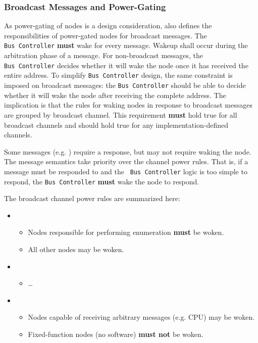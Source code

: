 \subsubsection{Broadcast Messages and Power-Gating}
As power-gating of nodes is a \bus design consideration, \bus also defines the
responsibilities of power-gated nodes for broadcast messages. The {\tt
Bus~Controller} {\bf must} wake for every message. Wakeup shall occur during
the arbitration phase of a message. For non-broadcast messages, the {\tt
Bus~Controller} decides whether it will wake the node once it has received the
entire address. To simplify {\tt Bus~Controller} design, the same constraint
is imposed on broadcast messages: the {\tt Bus~Controller} should be able to
decide whether it will wake the node after receiving the complete address.
The implication is that the rules for waking nodes in response to broadcast
messages are grouped by broadcast channel. This requirement {\bf must} hold
true for all \bus broadcast channels and should hold true for any
implementation-defined channels.

Some messages (e.g. ) require a response, but may
not require waking the node. The message semantics take priority over the
channel power rules. That is, if a message must be responded to and the {\tt
Bus~Controller} logic is too simple to respond, the {\tt Bus~Controller} {\bf
must} wake the node to respond.

The \bus broadcast channel power rules are summarized here:
\begin{itemize}
  \item {}
  \begin{itemize}
    \item Nodes responsible for performing enumeration {\bf must} be woken.
    \item All other nodes may be woken.
  \end{itemize}
  \item {}
  \begin{itemize}
    \item \dots
  \end{itemize}
  \item {}
  \begin{itemize}
    \item Nodes capable of receiving arbitrary messages (e.g. CPU) may be
             woken.
    \item Fixed-function nodes (no software) {\bf must not} be woken.
  \end{itemize}
\end{itemize}

